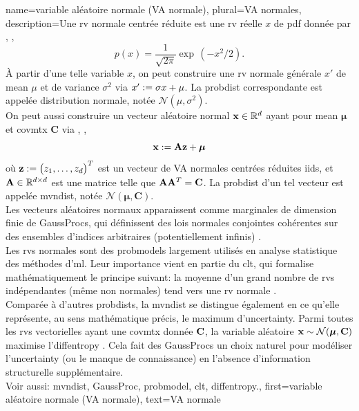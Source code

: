{name={variable aléatoire normale (VA normale)}, 
	plural={VA normales}, 
	description={Une  \gls{rv} normale centrée réduite est une 
		\gls{rv} réelle $x$ de \gls{pdf} donnée par \cite{BertsekasProb}, \cite{GrayProbBook}, \cite{papoulis}
		\begin{equation}
			\nonumber
			p(x) = \frac{1}{\sqrt{2\pi}} \exp\,(-x^2/2). 
		\end{equation}
		À partir d'une telle variable $x$, on peut construire une \gls{rv} normale générale $x'$ de 
		\gls{mean} $\mu$ et de \gls{variance} $\sigma^2$ via $x' := \sigma x + \mu$. 
		La \gls{probdist} correspondante est appelée distribution normale, notée $\mathcal{N}(\mu, \sigma^2)$. 
		\\ 
		On peut aussi construire un vecteur aléatoire normal ${\bf x} \in \mathbb{R}^{d}$ 
		ayant pour \gls{mean} ${\bm \mu}$ et \gls{covmtx} $\mathbf{C}$ via \cite{GrayProbBook}, \cite{papoulis}, \cite{Lapidoth09}
		\[
		{\bf x} := \mathbf{A} {\bf z} + {\bm \mu}
		\]
		où ${\bf z} := \big( z_{1}, \ldots, z_{d} \big)^{T}$ est un vecteur de 
		VA normales centrées réduites \glspl{iid}, et ${\bf A} \in \mathbb{R}^{d \times d}$ 
		est une matrice telle que ${\bf A} {\bf A}^{T} = {\bf C}$. La \gls{probdist} d’un tel vecteur est appelée 
		\gls{mvndist}, notée $\mathcal{N}({\bm \mu}, \mathbf{C})$.
		\\
		Les vecteurs aléatoires normaux apparaissent comme marginales de dimension finie de 
		\glspl{GaussProc}, qui définissent des lois normales conjointes cohérentes sur des ensembles d’indices arbitraires 
		(potentiellement infinis) \cite{Rasmussen2006Gaussian}. 
		\\
		Les \glspl{rv} normales sont des \glspl{probmodel} largement utilisés en analyse statistique des méthodes d'\gls{ml}. 
		Leur importance vient en partie du \gls{clt}, qui formalise mathématiquement le principe suivant: 
		la moyenne d’un grand nombre de \glspl{rv} indépendantes (même non normales) tend vers une \gls{rv} normale \cite{ross2013first}.
		\\ 
		Comparée à d'autres \glspl{probdist}, la \gls{mvndist} se distingue également en ce qu'elle représente, au sens mathématique précis, le \gls{maximum} d'\gls{uncertainty}.
		Parmi toutes les \glspl{rv} vectorielles ayant une \gls{covmtx} donnée ${\bf C}$, la variable aléatoire ${\bf x} \sim \mathcal{N}({\bm \mu}, \mathbf{C})$ maximise l'\gls{diffentropy} \cite[Th. 8.6.5]{coverthomas}.
		Cela fait des \glspl{GaussProc} un choix naturel pour modéliser l'\gls{uncertainty} (ou le manque de connaissance) en l'absence d'information structurelle supplémentaire.
		\\ 
		Voir aussi: \gls{mvndist}, \gls{GaussProc}, \gls{probmodel}, \gls{clt}, \gls{diffentropy}.},
	first={variable aléatoire normale (VA normale)},
	text={VA normale}
}

